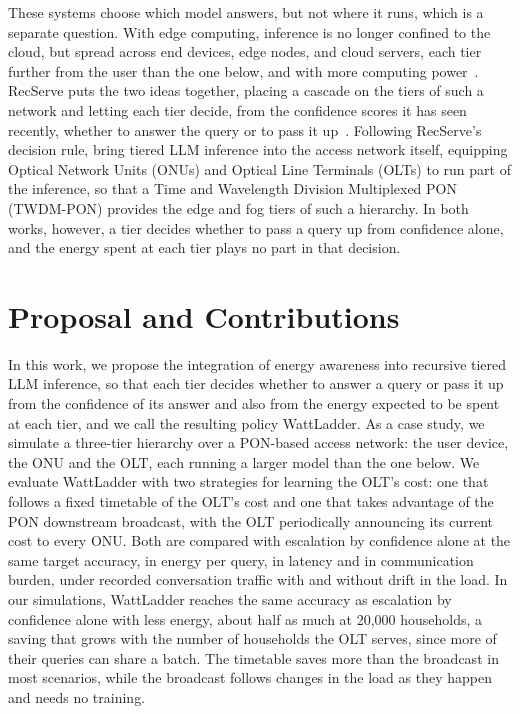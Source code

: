 \documentclass[cic,dipl,english]{infufrgs}
\begin{document}
These systems choose which model answers, but not where it runs, which is a separate
question. With edge computing, inference is no longer confined to the cloud, but spread
across end devices, edge nodes, and cloud servers, each tier further from the user than
the one below, and with more computing power~\cite{chen2026network}. RecServe puts the two ideas together, placing a cascade on
the tiers of such a network and letting each tier decide, from the confidence scores it
has seen recently, whether to answer the query or to pass it up~\cite{wu2025recserve}.
Following RecServe's decision rule,  bring tiered
LLM inference into the access network itself, equipping Optical Network Units (ONUs)
and Optical Line Terminals (OLTs) to run part of the inference, so that a Time and
Wavelength Division Multiplexed PON (TWDM-PON) provides the edge and fog tiers of
such a hierarchy. In both works, however, a tier decides whether to pass a query up
from confidence alone, and the energy spent at each tier plays no part in that
decision.

\section{Proposal and Contributions}
\label{sec:proposal}

In this work, we propose the integration of energy awareness into recursive tiered LLM
inference, so that each tier decides whether to answer a query or pass it up from the
confidence of its answer and also from the energy expected to be spent at each tier, and
we call the resulting policy WattLadder. As a case study, we simulate a three-tier
hierarchy over a PON-based access network: the user device, the ONU and the OLT, each running a
larger model than the one below. We evaluate WattLadder with two strategies for learning the
OLT's cost: one that
follows a fixed timetable of the OLT's cost and one that takes advantage of the PON
downstream broadcast, with the OLT periodically announcing its current cost to every
ONU. Both are compared with escalation by confidence alone at the same target accuracy, in energy per query,
in latency and in communication burden, under recorded conversation traffic with and without
drift in the load. In our simulations, WattLadder reaches the same accuracy as escalation by
confidence alone with less energy, about half as much at 20,000 households, a saving that grows
with the number of households the OLT serves, since more of their queries can share a batch. The timetable saves more than
the broadcast in most scenarios, while the broadcast follows changes in the load as they happen
and needs no training.
\end{document}
